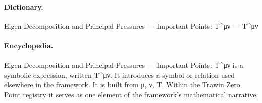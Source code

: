 \paragraph{Dictionary.}
Eigen-Decomposition and Principal Pressures — Important Points: T\textasciicircum{}μν — T\textasciicircum{}μν

\paragraph{Encyclopedia.}
Eigen-Decomposition and Principal Pressures — Important Points: T\textasciicircum{}μν is a symbolic expression, written T\textasciicircum{}μν. It introduces a symbol or relation used elsewhere in the framework. It is built from μ, ν, T. Within the Trawin Zero Point registry it serves as one element of the framework's mathematical narrative.

